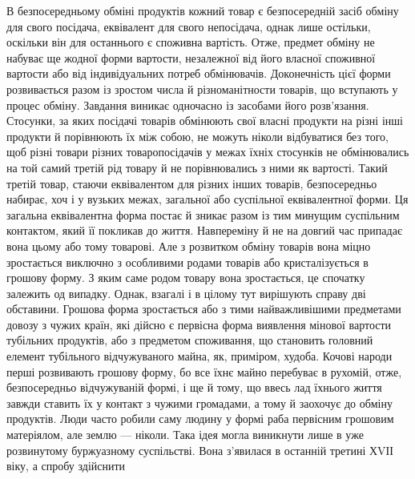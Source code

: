 В безпосередньому обміні продуктів кожний товар є безпосередній
засіб обміну для свого посідача, еквівалент для свого
непосідача, однак лише остільки, оскільки він для останнього
є споживна вартість. Отже, предмет обміну не набуває ще жодної
форми вартости, незалежної від його власної споживної вартости
або від індивідуальних потреб обмінювачів. Доконечність цієї
форми розвивається разом із зростом числа й різноманітности
товарів, що вступають у процес обміну. Завдання виникає одночасно
із засобами його розв’язання. Стосунки, за яких посідачі
товарів обмінюють свої власні продукти на різні інші продукти
й порівнюють їх між собою, не можуть ніколи відбуватися без
того, щоб різні товари різних товаропосідачів у межах їхніх
стосунків не обмінювались на той самий третій рід товару й не
порівнювались з ними як вартості. Такий третій товар, стаючи
еквівалентом для різних інших товарів, безпосередньо набирає,
хоч і у вузьких межах, загальної або суспільної еквівалентної
форми. Ця загальна еквівалентна форма постає й зникає разом
із тим минущим суспільним контактом, який її покликав до життя.
Навпереміну й не на довгий час припадає вона цьому або тому
товарові. Але з розвитком обміну товарів вона міцно зростається
виключно з особливими родами товарів або кристалізується в
грошову форму. З яким саме родом товару вона зростається, це
спочатку залежить од випадку. Однак, взагалі і в цілому тут
вирішують справу дві обставини. Грошова форма зростається
або з тими найважливішими предметами довозу з чужих країн,
які дійсно є первісна форма виявлення мінової вартости тубільних
продуктів, або з предметом споживання, що становить головний
елемент тубільного відчужуваного майна, як, приміром, худоба.
Кочові народи перші розвивають грошову форму, бо все їхнє
майно перебуває в рухомій, отже, безпосередньо відчужуваній
формі, і ще й тому, що ввесь лад їхнього життя завжди ставить
їх у контакт з чужими громадами, а тому й заохочує до обміну
продуктів. Люди часто робили саму людину у формі раба первісним
грошовим матеріялом, але землю — ніколи. Така ідея могла
виникнути лише в уже розвинутому буржуазному суспільстві.
Вона з’явилася в останній третині ХVІІ віку, а спробу здійснити
\parbreak{}  %
